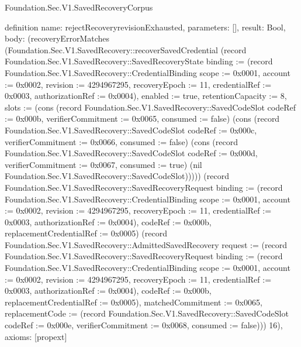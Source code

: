 \begin{lexlean}{Foundation.Sec.V1.SavedRecoveryCorpus}
\begin{semanticmodule}
definition{
  name: rejectRecoveryrevisionExhausted,
  parameters: [],
  result: Bool,
  body: (recoveryErrorMatches (Foundation.Sec.V1.SavedRecovery::recoverSavedCredential (record Foundation.Sec.V1.SavedRecovery::SavedRecoveryState {binding := (record Foundation.Sec.V1.SavedRecovery::CredentialBinding {scope := 0x0001, account := 0x0002, revision := 4294967295, recoveryEpoch := 11, credentialRef := 0x0003, authorizationRef := 0x0004}), enabled := true, retentionCapacity := 8, slots := (cons (record Foundation.Sec.V1.SavedRecovery::SavedCodeSlot {codeRef := 0x000b, verifierCommitment := 0x0065, consumed := false}) (cons (record Foundation.Sec.V1.SavedRecovery::SavedCodeSlot {codeRef := 0x000c, verifierCommitment := 0x0066, consumed := false}) (cons (record Foundation.Sec.V1.SavedRecovery::SavedCodeSlot {codeRef := 0x000d, verifierCommitment := 0x0067, consumed := true}) (nil Foundation.Sec.V1.SavedRecovery::SavedCodeSlot))))}) (record Foundation.Sec.V1.SavedRecovery::SavedRecoveryRequest {binding := (record Foundation.Sec.V1.SavedRecovery::CredentialBinding {scope := 0x0001, account := 0x0002, revision := 4294967295, recoveryEpoch := 11, credentialRef := 0x0003, authorizationRef := 0x0004}), codeRef := 0x000b, replacementCredentialRef := 0x0005}) (record Foundation.Sec.V1.SavedRecovery::AdmittedSavedRecovery {request := (record Foundation.Sec.V1.SavedRecovery::SavedRecoveryRequest {binding := (record Foundation.Sec.V1.SavedRecovery::CredentialBinding {scope := 0x0001, account := 0x0002, revision := 4294967295, recoveryEpoch := 11, credentialRef := 0x0003, authorizationRef := 0x0004}), codeRef := 0x000b, replacementCredentialRef := 0x0005}), matchedCommitment := 0x0065, replacementCode := (record Foundation.Sec.V1.SavedRecovery::SavedCodeSlot {codeRef := 0x000e, verifierCommitment := 0x0068, consumed := false})})) 16),
  axioms: [propext]
}


\end{semanticmodule}
\end{lexlean}
